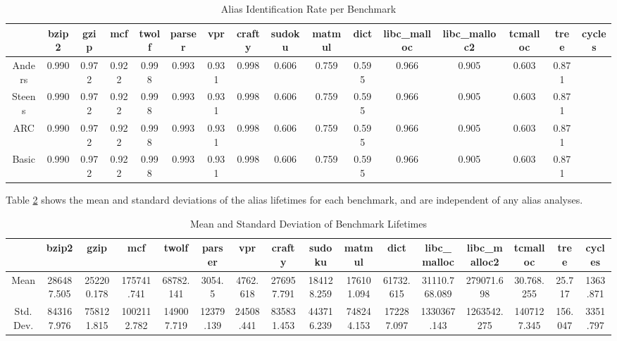 \begin{table} [h!]
\centering
   \begin{tabular} {|c|c c c c c c c c c c c c c c c|}
      \hline
      & bzip2 & gzip & mcf & twolf & parser & vpr & crafty & sudoku & matmul & dict & libc\_malloc & libc\_malloc2 & tcmalloc & tree & cycles \\
      \hline
      Anders & 0.990 & 0.972 & 0.922 & 0.998 & 0.993 & 0.931 & 0.998 & 0.606 & 0.759 & 0.595 & 0.966 & 0.905 & 0.603 & 0.871 \\
      \hline
      Steens & 0.990 & 0.972 & 0.922 & 0.998 & 0.993 & 0.931 & 0.998 & 0.606 & 0.759 & 0.595 & 0.966 & 0.905 & 0.603 & 0.871 \\
      \hline
      ARC & 0.990 & 0.972 & 0.922 & 0.998 & 0.993 & 0.931 & 0.998 & 0.606 & 0.759 & 0.595 & 0.966 & 0.905 & 0.603 & 0.871 \\
      \hline
      Basic & 0.990 & 0.972 & 0.922 & 0.998 & 0.993 & 0.931 & 0.998 & 0.606 & 0.759 & 0.595 & 0.966 & 0.905 & 0.603 & 0.871 \\
      \hline
   \end{tabular}
   \caption{Alias Identification Rate per Benchmark}
   \label{table:4}
\end{table}

Table \ref{table:5} shows the mean and standard deviations of the alias lifetimes for each benchmark, and are independent of any alias analyses.

\begin{table} [h!]
\centering
   \begin{tabular} {|c|c c c c c c c c c c c c c c c|}
      \hline
      & bzip2 & gzip & mcf & twolf & parser & vpr & crafty & sudoku & matmul & dict & libc\_malloc & libc\_malloc2 & tcmalloc & tree & cycles \\
      \hline
      Mean & 286487.505 & 252200.178 & 175741.741 & 68782.141 & 3054.5 & 4762.618 & 276957.791 & 184128.259 & 176101.094 & 61732.615 & 31110.768.089 & 279071.698 & 30.768.255 & 25.717 & 1363.871 \\
      \hline
      Std. Dev. & 843167.976 & 758121.815 & 1002112.782 & 149007.719 & 12379.139 & 24508.441 & 835831.453 & 443716.239 & 748244.153 & 172287.097 & 1330367.143 & 1263542.275 & 1407127.345 & 156.047 & 3351.797 \\
      \hline
   \end{tabular}
   \caption{Mean and Standard Deviation of Benchmark Lifetimes}
   \label{table:5}
\end{table}

